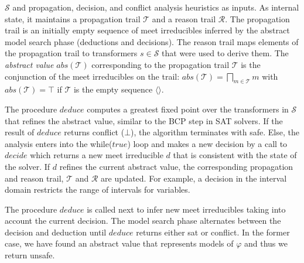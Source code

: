 $\mathcal{S}$ and propagation, decision, and conflict analysis
heuristics as inputs.  As internal state, it maintains a propagation
trail $\mathcal{T}$ and a reason trail  $\mathcal{R}$.
The propagation trail is an initially empty sequence of meet
irreducibles inferred by the abstract model search phase (deductions
and decisions). The reason trail maps  elements of the
propagation trail to transformers $s\in\mathcal{S}$ that were used to
derive them. The \emph{abstract value} $\mathit{abs}(\mathcal{T})$
corresponding to the propagation trail $\mathcal{T}$ is the
conjunction of the meet irreducibles on the trail:
$\mathit{abs}(\mathcal{T})=\bigsqcap_{m \in \mathcal{T}}m$ with
$\mathit{abs}(\mathcal{T})=\top$ if $\mathcal{T}$ is the empty
sequence $\langle\rangle$.

The procedure $deduce$ computes a greatest fixed point over the
transformers in $\mathcal{S}$ that refines the abstract value,
similar to the BCP step in SAT solvers.  If the result of $deduce$
returns \textsf{conflict} ($\bot$), the algorithm terminates with
\textsf{safe}.  Else, the analysis enters into the while($true$) loop
and makes a new decision by a call to $\mathit{decide}$ which returns
a new meet irreducible $d$ that is consistent with the state of the
solver.  If $d$
refines the current abstract value, the corresponding propagation
and reason trail, $\mathcal{T}$ and $\mathcal{R}$ are updated.
%
For example, a decision in the interval domain restricts the range of 
intervals for variables.

The procedure $\mathit{deduce}$ is called next to infer new meet
irreducibles taking into account the current decision.  The model search phase
alternates between the decision and deduction until $\mathit{deduce}$
returns either \textsf{sat} or \textsf{conflict}.
In the former case, we have found an abstract value that represents 
models of $\varphi$ and thus we return \textsf{unsafe}.
%

